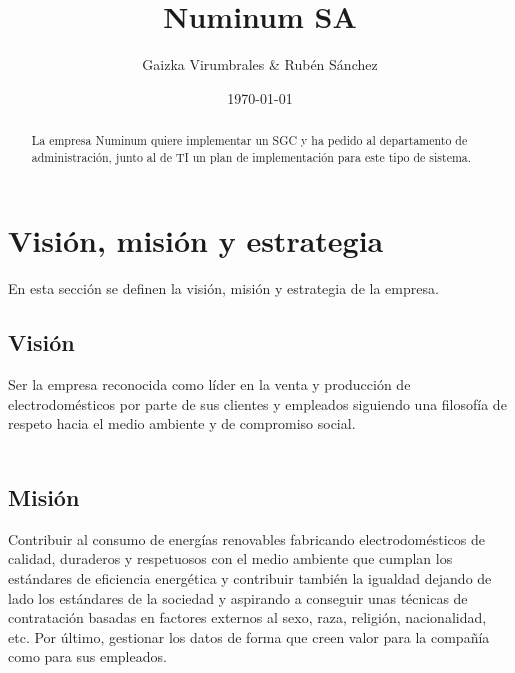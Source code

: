 \documentclass[twoside]{article}
\title{Numinum SA}
\author{Gaizka Virumbrales \& Rubén Sánchez}
\date{\today}
\begin{document}
\maketitle
\thispagestyle{empty}
\newpage
\newpage
\null
\thispagestyle{empty}
\newpage



\begin{abstract}
La empresa Numinum quiere implementar un SGC y ha pedido al departamento de administración, junto al de TI un plan de implementación para este tipo de sistema.
\end{abstract}


\setcounter{tocdepth}{2}
\tableofcontents
\newpage
{}
\setcounter{page}{1}
\section{Visión, misión y estrategia}

En esta sección se definen la visión, misión y estrategia de la empresa.

\subsection{Visión}
\label{sec:vision}

Ser la empresa reconocida como líder en la venta y producción de electrodomésticos por parte de sus clientes y empleados siguiendo una filosofía de respeto hacia el medio ambiente y de compromiso social.
\\
\\

\subsection{Misión}
\label{sec:mision}

Contribuir al consumo de energías renovables fabricando electrodomésticos de calidad, duraderos y respetuosos con el medio ambiente que cumplan los estándares de eficiencia energética y contribuir también la igualdad dejando de lado los estándares de la sociedad y aspirando a conseguir unas técnicas de contratación basadas en factores externos al sexo, raza, religión, nacionalidad, etc. Por último, gestionar los datos de forma que creen valor para la compañía como para sus empleados.
%
\\
\\
\end{document}
